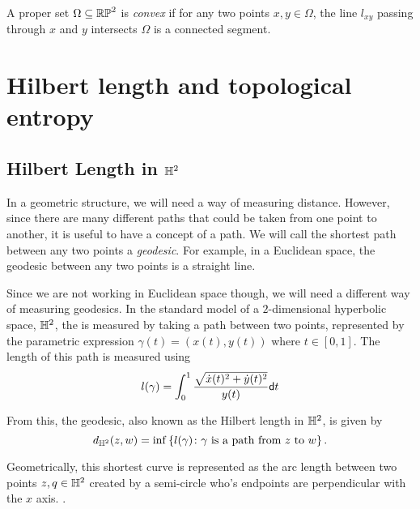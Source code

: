 \documentclass{amsart}
\begin{document}
	A proper set $\Omega \subseteq \mathbb{RP}^2$ is \emph{convex} if for any two points $x,y \in \Omega$, the line $l_{xy}$ passing through $x$ and $y$ intersects $\Omega$ is a connected segment.
	
	
	\section{Hilbert length and topological entropy}
	
	\subsection{Hilbert Length in $\mathbb{H}^2$}
	
	In a geometric structure, we will need a way of measuring distance. However, since there are many different paths that could be taken from one point to another, it is useful to have a concept of a  path. We will call the shortest path between any two points a \emph{geodesic}. For example, in a Euclidean space, the geodesic between any two points is a straight line. 
	
	Since we are not working in Euclidean space though, we will need a different way of measuring geodesics. In the standard model of a $2$-dimensional hyperbolic space, $\mathbb{H}^2$, the  is measured by taking a path between two points, represented by the parametric expression $\gamma(t) = (x(t), y(t))$ where $t \in [0,1]$. The length of this path is measured using
	\begin{equation*}
		l(\gamma) = \int_{0}^{1} \frac{\sqrt{\dot{x}(t)^2 + \dot{y}(t)^2}}{y(t)} \mathsf{d} t
	\end{equation*}
	
	From this, the geodesic, also known as the Hilbert length in $\mathbb{H}^2$, is given by
	\begin{equation*}
		d_{\mathbb{H}^2}(z,w) = \inf \left\{l(\gamma) \colon \gamma \text{ is a path from } z \text{ to } w\right\}.
	\end{equation*}
	
	Geometrically, this shortest curve is represented as the arc length between two points $z,q \in \mathbb{H}^2$ created by a semi-circle who's endpoints are perpendicular with the $x$ axis. .
	
\end{document}

